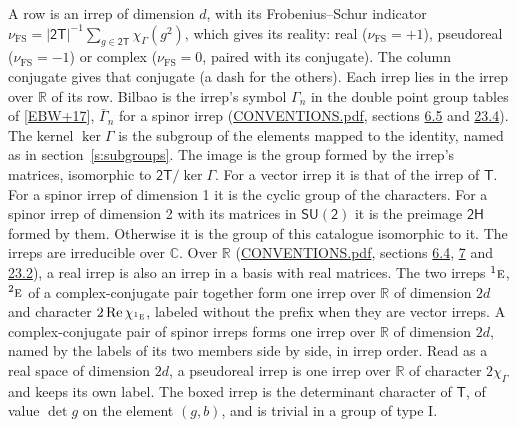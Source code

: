 \documentclass[10pt,a4paper]{article}
\numberwithin{equation}{section}
\newcommand{\grp}[1]{\mathsf{#1}}
\newcommand{\irr}[1]{\text{\normalfont\scshape #1}}
\newcommand{\conjpair}[1]{{}^{#1}}
\newcommand{\irchar}[1]{\chi_{#1}}
\newcommand{\fsind}{\nu_{\mathrm{FS}}}
\begin{document}
\leavevmode\label{n:index.frobenius}\label{n:head.irrep}\label{n:head.reality}A row is an irrep of dimension $d$, with its Frobenius--Schur indicator $\fsind = |\grp{2T}|^{-1}\allowbreak\sum_{g\in\grp{2T}}\irchar{\Gamma}(g^2)$, which gives its reality: real ($\fsind = +1$), pseudoreal ($\fsind = -1$) or complex ($\fsind = 0$, paired with its conjugate). \label{n:head.conjugate}The column conjugate gives that conjugate (a dash for the others). \label{n:head.over.real}Each irrep lies in the irrep over $\mathbb{R}$ of its row. \label{n:head.bilbao}\label{n:irrep.alias.gamma}Bilbao is the irrep's symbol $\Gamma_n$ in the double point group tables of [\href{../../../REFERENCES.pdf\#ref.EBW+17}{EBW+17}], $\bar{\Gamma}_n$ for a spinor irrep (\href{../../CONVENTIONS.pdf}{CONVENTIONS.pdf}, sections \href{../../../rotation/CONVENTIONS.pdf\#conv.6.5}{6.5} and \href{../../CONVENTIONS.pdf\#conv.23.4}{23.4}). \label{n:head.kernel}The kernel $\ker\Gamma$ is the subgroup of the elements mapped to the identity, named as in section~\ref{s:subgroups}. \label{n:head.image}The image is the group formed by the irrep's matrices, isomorphic to $\grp{2T}/\ker\Gamma$. For a vector irrep it is that of the irrep of \href{../../../rotation/data/pdf/T.pdf}{$\grp{T}$}. For a spinor irrep of dimension 1 it is the cyclic group of the characters. For a spinor irrep of dimension 2 with its matrices in $\grp{SU(2)}$ it is the preimage $\grp{2H}$ formed by them. Otherwise it is the group of this catalogue isomorphic to it. The irreps are irreducible over $\mathbb{C}$. Over $\mathbb{R}$ (\href{../../CONVENTIONS.pdf}{CONVENTIONS.pdf}, sections \href{../../../rotation/CONVENTIONS.pdf\#conv.6.4}{6.4}, \href{../../../rotation/CONVENTIONS.pdf\#conv.7}{7} and \href{../../CONVENTIONS.pdf\#conv.23.2}{23.2}), a real irrep is also an irrep in a basis with real matrices. The two irreps $\conjpair{1}\irr{e}$, $\conjpair{2}\irr{e}$ of a complex-conjugate pair together form one irrep over $\mathbb{R}$ of dimension $2d$ and character $2\operatorname{Re}\irchar{\conjpair{1}\irr{e}}$, labeled without the prefix when they are vector irreps. A complex-conjugate pair of spinor irreps forms one irrep over $\mathbb{R}$ of dimension $2d$, named by the labels of its two members side by side, in irrep order. Read as a real space of dimension $2d$, a pseudoreal irrep is one irrep over $\mathbb{R}$ of character $2\irchar{\Gamma}$ and keeps its own label. \label{n:mark.determinant}The boxed irrep is the determinant character of \href{../../../rotation/data/pdf/T.pdf}{$\grp{T}$}, of value $\det g$ on the element $(g, b)$, and is trivial in a group of type I.
\end{document}
